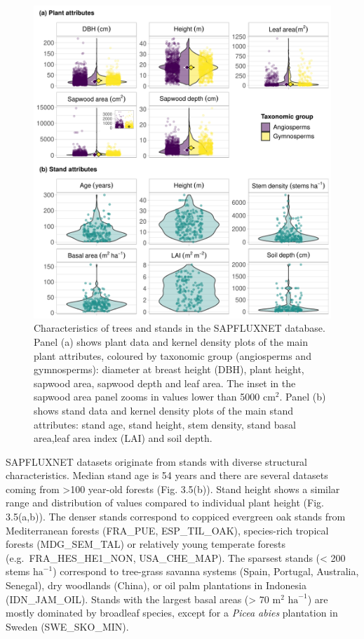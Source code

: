 \documentclass[11pt,twoside]{reedthesis}
\begin{document}
\setlength{\abovecaptionskip}{0pt}
\begin{figure}[hbt!]

{\centering \includegraphics[width=1\linewidth]{figure/CH3/Figure5} 

}

\caption[Characteristics of trees and stands in the SAPFLUXNET database.]{Characteristics of trees and stands in the SAPFLUXNET database. Panel (a) shows plant data and kernel density plots of the main plant attributes, coloured by taxonomic group (angiosperms and gymnosperms): diameter at breast height (DBH), plant height, sapwood area, sapwood depth and leaf area. The inset in the sapwood area panel zooms in values lower than 5000 $\text{cm}^2$. Panel (b) shows stand data and kernel density plots of the main stand attributes: stand age, stand height, stem density, stand basal area,leaf area index (LAI) and soil depth.}\label{fig:Ch2plot5}
\end{figure}
SAPFLUXNET datasets originate from stands with diverse structural
characteristics. Median stand age is 54 years and there are several
datasets coming from \textgreater{}100 year-old forests (Fig. 3.5(b)).
Stand height shows a similar range and distribution of values compared
to individual plant height (Fig. 3.5(a,b)). The denser stands correspond
to coppiced evergreen oak stands from Mediterranean forests (FRA\_PUE,
ESP\_TIL\_OAK), species-rich tropical forests (MDG\_SEM\_TAL) or
relatively young temperate forests (e.g.~FRA\_HES\_HE1\_NON,
USA\_CHE\_MAP). The sparsest stands (\textless{} 200 stems
\(\text{ha}^{-1}\)) correspond to tree-grass savanna systems (Spain,
Portugal, Australia, Senegal), dry woodlands (China), or oil palm
plantations in Indonesia (IDN\_JAM\_OIL). Stands with the largest basal
areas (\textgreater{} 70 \(\text{m}^2\) \(\text{ha}^{-1}\)) are mostly
dominated by broadleaf species, except for a \emph{Picea abies}
plantation in Sweden (SWE\_SKO\_MIN).\par
\end{document}
